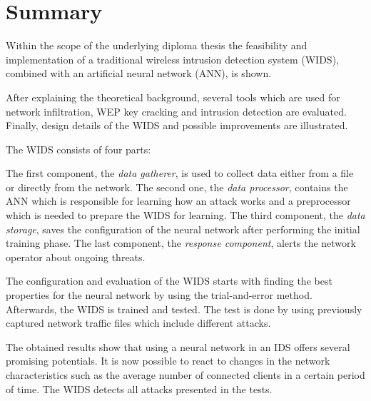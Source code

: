 \chapter*{Summary}

Within the scope of the underlying diploma thesis the feasibility and implementation of a traditional wireless intrusion detection system (WIDS), combined with an artificial neural network (ANN), is shown.

After explaining the theoretical background, several tools which are used for network infiltration, WEP key cracking and intrusion detection are evaluated. Finally, design details of the WIDS and possible improvements are illustrated.

The WIDS consists of four parts:

The first component, the {\em data gatherer}, is used to collect data either from a file or directly from the network. The second one, the {\em data processor}, contains the ANN which is responsible for learning how an attack works and a preprocessor which is needed to prepare the WIDS for learning. The third component, the {\em data storage}, saves the configuration of the neural network after performing the initial training phase. The last component, the {\em response component}, alerts the network operator about ongoing threats.

The configuration and evaluation of the WIDS starts with finding the best  properties for the neural network by using the trial-and-error method. Afterwards, the WIDS is trained and tested. The test is done by using previously captured network traffic files which include different attacks.

The obtained results show that using a neural network in an IDS offers several promising potentials. It is now possible to react to changes in the network characteristics such as the average number of connected clients in a certain period of time. The WIDS detects all attacks presented in the tests.
